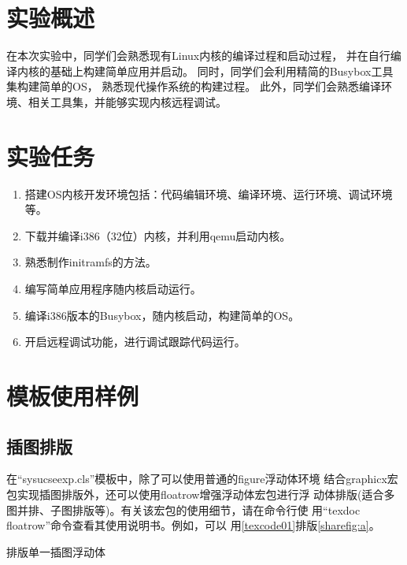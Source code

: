 \documentclass{sysucseexp}
\begin{document}

\makecover
\tableofcontents
\cleardoublepage
\pagestyle{main} %

\section{实验概述}
在本次实验中，同学们会熟悉现有Linux内核的编译过程和启动过程， 并在自行编译内核的基础上构建简单应用并启动。
同时，同学们会利用精简的Busybox工具集构建简单的OS， 熟悉现代操作系统的构建过程。 此外，同学们会熟悉编译环境、相关工具集，并能够实现内核远程调试。
\section{实验任务}
\begin{enumerate}
  \item 搭建OS内核开发环境包括：代码编辑环境、编译环境、运行环境、调试环境等。
  \item 下载并编译i386（32位）内核，并利用qemu启动内核。
  \item 熟悉制作initramfs的方法。
  \item 编写简单应用程序随内核启动运行。
  \item 编译i386版本的Busybox，随内核启动，构建简单的OS。
  \item 开启远程调试功能，进行调试跟踪代码运行。
  \end{enumerate}

\section{模板使用样例}
\subsection{插图排版}
在\enquote{sysucseexp.cls}模板中，除了可以使用普通的figure浮动体环境
结合graphicx宏包实现插图排版外，还可以使用floatrow增强浮动体宏包进行浮
动体排版(适合多图并排、子图排版等)。有关该宏包的使用细节，请在命令行使
用\enquote{texdoc floatrow}命令查看其使用说明书。例如，可以
用\autoref{texcode01}排版\autoref{sharefig:a}。

\begin{center}
\begin{langCVOne}[tex][texcode01][\LaTeX{}]{排版单一插图浮动体}
  \begin{figure}[!htp]
    \begin{floatrow}
    \end{floatrow}
  \end{figure}
\end{langCVOne}
\end{center}
\end{document}
